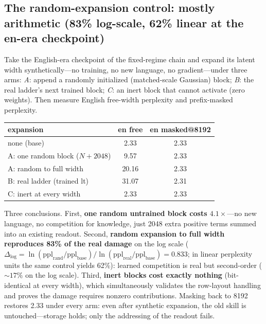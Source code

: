 \documentclass[11pt]{article}
\theoremstyle{definition}\newtheorem{definition}{Definition}
\theoremstyle{remark}\newtheorem{remark}{Remark}
\begin{document}
\subsection{The random-expansion control: mostly arithmetic (83\% log-scale, 62\% linear at the en-era checkpoint)}

Take the English-era checkpoint of the fixed-regime chain and expand its latent width
synthetically---no training, no new language, no gradient---under three arms:
\emph{A}: append a randomly initialized (matched-scale Gaussian) block; \emph{B}: the
real ladder's next trained block; \emph{C}: an inert block that cannot activate
(zero weights). Then measure English free-width perplexity and prefix-masked perplexity.

\begin{center}\small
\begin{tabular}{lcc}
\toprule
expansion & en free & en masked@8192 \\
\midrule
none (base) & 2.33 & 2.33 \\
A: one random block ($N{+}2048$) & 9.57 & 2.33 \\
A: random to full width & 20.16 & 2.33 \\
B: real ladder (trained lt) & 31.07 & 2.31 \\
C: inert at every width & 2.33 & 2.33 \\
\bottomrule
\end{tabular}
\end{center}

Three conclusions. First, \textbf{one random untrained block costs $4.1\times$}---no new
language, no competition for knowledge, just 2048 extra positive terms summed into an
existing readout. Second, \textbf{random expansion to full width reproduces 83\% of the
real damage} on the log scale ($\Delta_{\log} = \ln(\mathrm{ppl}_{\mathrm{rand}}/\mathrm{ppl}_{\mathrm{base}}) / \ln(\mathrm{ppl}_{\mathrm{real}}/\mathrm{ppl}_{\mathrm{base}}) = 0.833$; in linear perplexity units the same control yields 62\%): learned competition is real but second-order ($\sim\!17\%$ on the log scale).
Third, \textbf{inert blocks cost exactly nothing} (bit-identical at every width), which
simultaneously validates the row-layout handling and proves the damage requires nonzero
contributions. Masking back to 8192 restores 2.33 under every arm: even after synthetic
expansion, the old skill is untouched---storage holds; only the addressing of the readout
fails.
\end{document}
